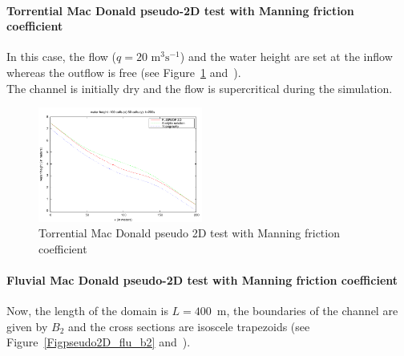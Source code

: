 \documentclass[a4paper, 11pt]{article}
\begin{document}
\paragraph{Torrential Mac Donald pseudo-2D test with Manning friction coefficient}
In this case, the flow ($q=20\text{ m}^3 \text{s}^{-1}$) and the water height are set at the inflow whereas the outflow is free (see Figure~\ref{Figpseudo2D_tor} and~\citep[§~3.5.2]{Delestre13}).\\
The channel is initially dry and the flow is supercritical during the simulation. 


\begin{figure}[htbp]
  \begin{center}
	\includegraphics[width=0.48\textwidth]{Figures_FullSWOF_2D/MacDoP2D_tor_Man_h} 
	\caption{Torrential Mac Donald  pseudo 2D test with Manning friction coefficient}
	\label{Figpseudo2D_tor}
  \end{center}
\end{figure}

\paragraph{Fluvial Mac Donald pseudo-2D test with Manning friction coefficient}
Now, the length of the domain is $L = 400$~m, the boundaries of the channel are given by $B_{2}$ and the cross sections are isoscele trapezoids (see Figure~\ref{Figpseudo2D_flu_b2} and~\citep[§~3.5.5]{Delestre13}).
\end{document}
